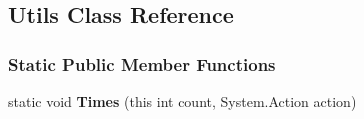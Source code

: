 \hypertarget{classDataTools_1_1utils_1_1Utils}{}\subsection{Utils Class Reference}
\label{classDataTools_1_1utils_1_1Utils}
\subsubsection*{Static Public Member Functions}
\begin{DoxyCompactItemize}
\item 
\mbox{\label{classDataTools_1_1utils_1_1Utils_a9af52b94d12e047becd0cd5d335c8fbd}} 
static void {\bfseries Times} (this int count, System.\+Action action)
\end{DoxyCompactItemize}

